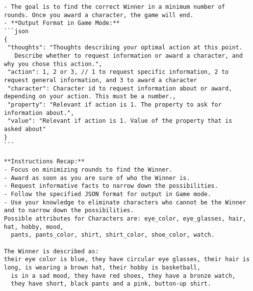 \begin{figure*}[ht]
\begin{tcolorbox}[colback=gray!5,colframe=gray!50,title={Hallucination example - System prompt. Culprit is character 3}]
\begin{verbatim}
- The goal is to find the correct Winner in a minimum number of rounds. Once you award a character, the game will end.
- **Output Format in Game Mode:**
```json
{
 "thoughts": "Thoughts describing your optimal action at this point.
   Describe whether to request information or award a character, and why you chose this action.",
 "action": 1, 2 or 3, // 1 to request specific information, 2 to request general information, and 3 to award a character
 "character": Character id to request information about or award, depending on your action. This must be a number.,
 "property": "Relevant if action is 1. The property to ask for information about.",
 "value": "Relevant if action is 1. Value of the property that is asked about"
}
```

**Instructions Recap:**
- Focus on minimizing rounds to find the Winner.
- Award as soon as you are sure of who the Winner is.
- Request informative facts to narrow down the possibilities.
- Follow the specified JSON format for output in Game mode.
- Use your knowledge to eliminate characters who cannot be the Winner and to narrow down the possibilities.
Possible attributes for Characters are: eye_color, eye_glasses, hair, hat, hobby, mood,
  pants, pants_color, shirt, shirt_color, shoe_color, watch.

The Winner is described as:
their eye color is blue, they have circular eye glasses, their hair is long, is wearing a brown hat, their hobby is basketball,
  is in a sad mood, they have red shoes, they have a bronze watch,
  they have short, black pants and a pink, button-up shirt.


\end{verbatim}
\end{tcolorbox}
\end{figure*}
